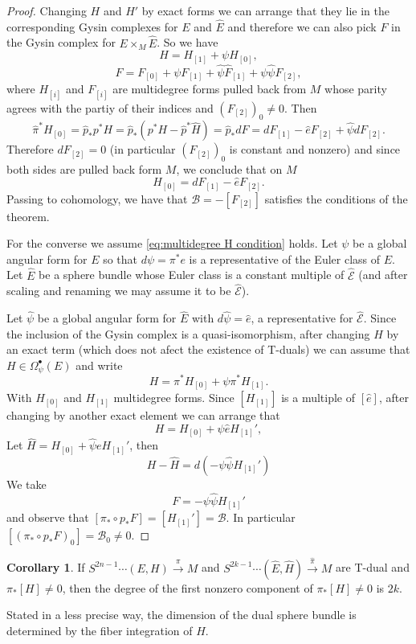 \documentclass[12pt,twoside]{article}
\theoremstyle{plain}
\theoremstyle{definition}
\newtheorem{corollary}[theorem]{Corollary}%
\newcommand{\mc}[1]{\text{$\mathcal{#1}$}}
\numberwithin{equation}{section}
\begin{document}
\begin{proof}
Changing $H$ and $H'$ by exact forms we can arrange that they lie in the corresponding Gysin complexes for $E$ and $\hat{E}$ and therefore we can also pick $F$ in the Gysin complex for $E\times_M \hat{E}$. So we have
\begin{equation}\label{eq:H looks like}
H = H_{[1]} +\psi  H_{[0]},
\end{equation}
\begin{equation}\label{eq:F looks like}
F = F_{[0]} +  \psi F_{[1]} +\hat\psi \hat{F}_{[1]} + \psi \hat\psi F_{[2]} ,
\end{equation}
where $H_{[i]}$ and $F_{[i]}$ are multidegree forms pulled back from $M$ whose parity agrees with the partiy of their indices and $(F_{[2]})_0 \neq 0$. Then
\[\hat{\pi}^*H_{[0]} = \hat{p}_* p^* H =\hat{p}_* (p^*H -\hat{p}^* \hat{H}) = \hat{p}_* dF = dF_{[1]} - \hat{e} F_{[2]} + \hat{\psi} dF_{[2]}. \]
Therefore $dF_{[2]}=0$ (in particular $(F_{[2]})_0$ is constant and nonzero) and since both sides are pulled back form $M$, we conclude that on $M$
\[H_{[0]}  = dF_{[1]} - \hat{e} F_{[2]}.\]
Passing to cohomology, we have that $\mc{B} =- [F_{[2]}]$ satisfies the conditions of the theorem. 

For the converse we assume \eqref{eq:multidegree H condition} holds. Let $\psi$ be a global angular form for $E$ so that $d\psi = \pi^*e$ is a representative of the Euler class of $E$. Let $\hat{E}$ be a sphere bundle whose Euler class is a constant multiple of $\hat{\mc{E}}$ (and after scaling and renaming we may assume it to be $\hat{\mc{E}}$).

Let $\hat{\psi}$ be a global angular form for $\hat{E}$ with $d\hat{\psi} = \hat{e}$, a representative for $\hat{\mc{E}}$. Since the inclusion of the Gysin complex is a quasi-isomorphism, after changing $H$ by an exact term (which does not afect the existence of T-duals) we can assume that $H \in \Omega^\bullet_\psi(E)$ and write
\[H = \pi^*H_ {[0]} + \psi \pi^*H_{[1]}.\]
With $H_{[0]}$ and $H_{[1]}$ multidegree forms. Since $[H_{[1]}]$ is a multiple of $[\hat{e}]$, after changing by another exact element we can arrange that
\[H = H_{[0]} + \psi \hat{e} H_{[1]}',\]
Let $\hat{H} = H_{[0]} + \hat{\psi} e H_{[1]}'$, then
\[H - \hat{H} = d(-\psi\hat{\psi} H_{[1]}')\]
We take
\[F = -\psi\hat{\psi} H_{[1]}'\]
 and observe that $[\pi_*\circ p_* F] = [H_{[1]}'] = \mc{B}$. In particular $[(\pi_*\circ p_* F)_0]=\mc{B}_0 \neq 0$.
\end{proof}

\begin{corollary}
If $S^{2n-1}\cdots (E,H) \stackrel{\pi}{\longrightarrow}M$ and $S^{2k-1}\cdots (\hat{E},\hat{H}) \stackrel{\hat{\pi}}{\longrightarrow}M$ are T-dual and
$\pi_*[H] \neq 0$, then the degree of the first nonzero component of $\pi_*[H] \neq 0$ is $2k$.
\end{corollary}
Stated in a less precise way, the dimension of the dual sphere bundle is determined by the fiber integration of $H$.
\end{document}
